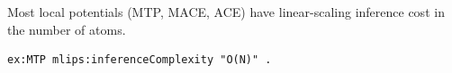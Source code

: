 Most local potentials (MTP, MACE, ACE) have linear-scaling inference
cost in the number of atoms.
\begin{lstlisting}[language=turtle]
ex:MTP mlips:inferenceComplexity "O(N)" .
\end{lstlisting}
